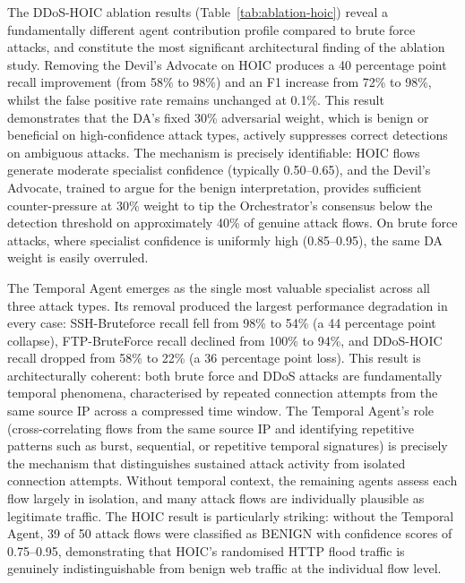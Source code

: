 The DDoS-HOIC ablation results (Table~\ref{tab:ablation-hoic}) reveal a fundamentally different agent contribution profile compared to brute force attacks, and constitute the most significant architectural finding of the ablation study. Removing the Devil's Advocate on HOIC produces a 40 percentage point recall improvement (from 58\% to 98\%) and an F1 increase from 72\% to 98\%, whilst the false positive rate remains unchanged at 0.1\%. This result demonstrates that the DA's fixed 30\% adversarial weight, which is benign or beneficial on high-confidence attack types, actively suppresses correct detections on ambiguous attacks. The mechanism is precisely identifiable: HOIC flows generate moderate specialist confidence (typically 0.50--0.65), and the Devil's Advocate, trained to argue for the benign interpretation, provides sufficient counter-pressure at 30\% weight to tip the Orchestrator's consensus below the detection threshold on approximately 40\% of genuine attack flows. On brute force attacks, where specialist confidence is uniformly high (0.85--0.95), the same DA weight is easily overruled.

The Temporal Agent emerges as the single most valuable specialist across all three attack types. Its removal produced the largest performance degradation in every case: SSH-Bruteforce recall fell from 98\% to 54\% (a 44 percentage point collapse), FTP-BruteForce recall declined from 100\% to 94\%, and DDoS-HOIC recall dropped from 58\% to 22\% (a 36 percentage point loss). This result is architecturally coherent: both brute force and DDoS attacks are fundamentally temporal phenomena, characterised by repeated connection attempts from the same source IP across a compressed time window. The Temporal Agent's role (cross-correlating flows from the same source IP and identifying repetitive patterns such as burst, sequential, or repetitive temporal signatures) is precisely the mechanism that distinguishes sustained attack activity from isolated connection attempts. Without temporal context, the remaining agents assess each flow largely in isolation, and many attack flows are individually plausible as legitimate traffic. The HOIC result is particularly striking: without the Temporal Agent, 39 of 50 attack flows were classified as BENIGN with confidence scores of 0.75--0.95, demonstrating that HOIC's randomised HTTP flood traffic is genuinely indistinguishable from benign web traffic at the individual flow level.

